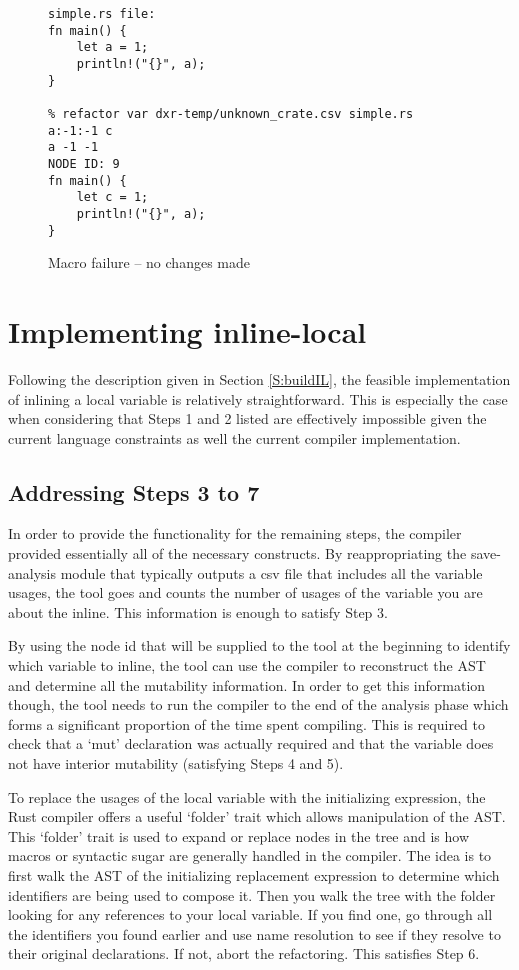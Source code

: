 \begin{figure}[H]
\centering
\begin{verbatim}
simple.rs file:
fn main() {
    let a = 1;
    println!("{}", a);
}

% refactor var dxr-temp/unknown_crate.csv simple.rs  a:-1:-1 c
a -1 -1
NODE ID: 9
fn main() {
    let c = 1;
    println!("{}", a);
}
\end{verbatim}
\caption{Macro failure -- no changes made}
\end{figure}

\section{Implementing inline-local}\label{S:ill}
Following the description given in Section \ref{S:buildIL}, the feasible implementation of inlining a local variable is relatively straightforward. This is especially the case when considering that Steps 1 and 2 listed are effectively impossible given the current language constraints as well the current compiler implementation.

\subsection{Addressing Steps 3 to 7}
In order to provide the functionality for the remaining steps, the compiler provided essentially all of the necessary constructs. By reappropriating the save-analysis module that typically outputs a csv file that includes all the variable usages, the tool goes and counts the number of usages of the variable you are about the inline. This information is enough to satisfy Step 3.

By using the node id that will be supplied to the tool at the beginning to identify which variable to inline, the tool can use the compiler to reconstruct the AST and determine all the mutability information. In order to get this information though, the tool needs to run the compiler to the end of the analysis phase which forms a significant proportion of the time spent compiling. This is required to check that a `mut' declaration was actually required and that the variable does not have interior mutability (satisfying Steps 4 and 5).

To replace the usages of the local variable with the initializing expression, the Rust compiler offers a useful `folder' trait which allows manipulation of the AST. This `folder' trait is used to expand or replace nodes in the tree and is how macros or syntactic sugar are generally handled in the compiler. The idea is to first walk the AST of the initializing replacement expression to determine which identifiers are being used to compose it. Then you walk the tree with the folder looking for any references to your local variable. If you find one, go through all the identifiers you found earlier and use name resolution to see if they resolve to their original declarations. If not, abort the refactoring. This satisfies Step 6.

